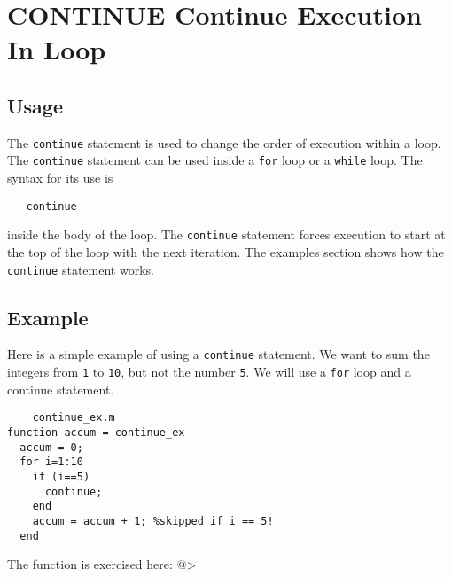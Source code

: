 \section{CONTINUE Continue Execution In Loop}

\subsection{Usage}

The \verb|continue| statement is used to change the order of
execution within a loop.  The \verb|continue| statement can
be used inside a \verb|for| loop or a \verb|while| loop.  The
syntax for its use is 
\begin{verbatim}
   continue
\end{verbatim}
inside the body of the loop.  The \verb|continue| statement
forces execution to start at the top of the loop with
the next iteration.  The examples section shows how
the \verb|continue| statement works.
\subsection{Example}

Here is a simple example of using a \verb|continue| statement.
We want to sum the integers from \verb|1| to \verb|10|, but not
the number \verb|5|.  We will use a \verb|for| loop and a continue
statement.
\begin{verbatim}
    continue_ex.m
function accum = continue_ex
  accum = 0;
  for i=1:10
    if (i==5)
      continue;
    end
    accum = accum + 1; %skipped if i == 5!
  end
\end{verbatim}
The function is exercised here:
@>

